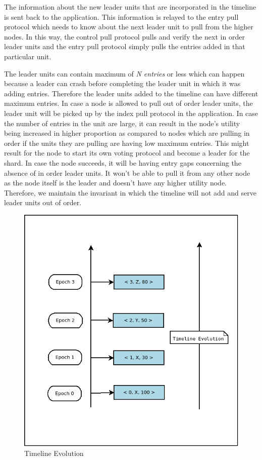 \documentclass[12pt,a4paper,twoside,openright]{book}
\begin{document}
The information about the new leader units that are incorporated in the timeline is sent back to the application. This information is relayed to the entry pull protocol which needs to know about the next leader unit to pull from the higher nodes. In this way, the control pull protocol pulls and verify the next in order leader units and the entry pull protocol simply pulls the entries added in that particular unit. 

\par The leader units can contain maximum of \textit{N entries} or less which can happen because a leader can crash before completing the leader unit in which it was adding entries. Therefore the leader units added to the timeline can have different maximum entries. In case a node is allowed to pull out of order leader units, the leader unit will be picked up by the index pull protocol in the application. In case the number of entries in the unit are large, it can result in the node's utility being increased in higher proportion as compared to nodes which are pulling in order if the units they are pulling are having low maximum entries. This might result for the node to start its own voting protocol and  become a leader for the shard. In case the node succeeds, it will be having entry gaps concerning the absence of in order leader units. It won't be able to pull it from any other node as the node itself is the leader and doesn't have any higher utility node. Therefore, we maintain the invariant in which the timeline will not add and serve leader units out of order. 



\begin{figure}[H]
	\includegraphics[scale=0.5]{timeline_new}
	\centering
	\caption{Timeline Evolution}
	\label{fig:timeline}
\end{figure}
\end{document}
